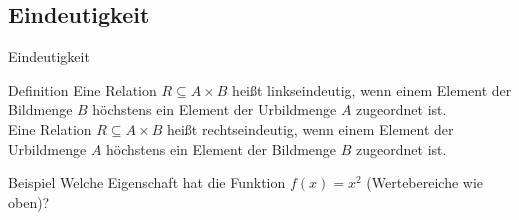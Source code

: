     \subsection{Eindeutigkeit}
        \begin{frame}{Eindeutigkeit}
            \begin{block}{Definition}
                Eine Relation $R \subseteq A \times B$ heißt linkseindeutig, wenn einem Element der Bildmenge $B$ höchstens ein Element der Urbildmenge $A$ zugeordnet ist.\\


                Eine Relation $R \subseteq A \times B$ heißt rechtseindeutig, wenn einem Element der Urbildmenge $A$ höchstens ein Element der Bildmenge $B$ zugeordnet ist.
            \end{block}
            \pause
            \begin{exampleblock}{Beispiel}
                Welche Eigenschaft hat die Funktion $f(x) = x^2$ (Wertebereiche wie oben)?
                \pause
            \end{exampleblock}
        \end{frame}

